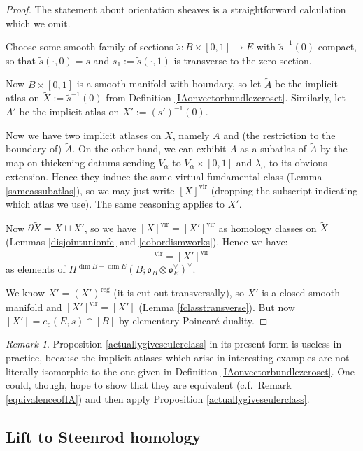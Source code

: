 \documentclass[12pt]{article}
\theoremstyle{definition}
\theoremstyle{remark}
\newtheorem{remark}[theorem]{Remark}
\numberwithin{equation}{subsection}
\newcommand{\oo}{\mathfrak o}
\newcommand{\vir}{\mathrm{vir}}
\newcommand{\reg}{\mathrm{reg}}
\begin{document}
\begin{proof}
The statement about orientation sheaves is a straightforward calculation which we omit.

Choose some smooth family of sections $\tilde s:B\times[0,1]\to E$ with $\tilde s^{-1}(0)$ compact, so that $\tilde s(\cdot,0)=s$ and $s_1:=\tilde s(\cdot,1)$ is transverse to the zero section.

Now $B\times[0,1]$ is a smooth manifold with boundary, so let $\tilde A$ be the implicit atlas on $\tilde X:=\tilde s^{-1}(0)$ from Definition \ref{IAonvectorbundlezeroset}.  Similarly, let $A'$ be the implicit atlas on $X':=(s')^{-1}(0)$.

Now we have two implicit atlases on $X$, namely $A$ and (the restriction to the boundary of) $\tilde A$.  On the other hand, we can exhibit $A$ as a subatlas of $\tilde A$ by the map on thickening datums sending $V_\alpha$ to $V_\alpha\times[0,1]$ and $\lambda_\alpha$ to its obvious extension.  Hence they induce the same virtual fundamental class (Lemma \ref{sameassubatlas}), so we may just write $[X]^\vir$ (dropping the subscript indicating which atlas we use).  The same reasoning applies to $X'$.

Now $\partial\tilde X=X\sqcup X'$, so we have $[X]^\vir=[X']^\vir$ as homology classes on $\tilde X$ (Lemmas \ref{disjointunionfc} and \ref{cobordismworks}).  Hence we have:
\begin{equation}
[X]^\vir=[X']^\vir
\end{equation}
as elements of $H^{\dim B-\dim E}(B;\oo_B\otimes\oo_E^\vee)^\vee$.

We know $X'=(X')^\reg$ (it is cut out transversally), so $X'$ is a closed smooth manifold and $[X']^\vir=[X']$ (Lemma \ref{fclasstransverse}).  But now $[X']=e_c(E,s)\cap[B]$ by elementary Poincar\'e duality.
\end{proof}

\begin{remark}
Proposition \ref{actuallygiveseulerclass} in its present form is useless in practice, because the implicit atlases which arise in interesting examples are not literally isomorphic to the one given in Definition \ref{IAonvectorbundlezeroset}.  One could, though, hope to show that they are equivalent (c.f.\ Remark \ref{equivalenceofIA}) and then apply Proposition \ref{actuallygiveseulerclass}.
\end{remark}

\subsection{Lift to Steenrod homology}
\end{document}
